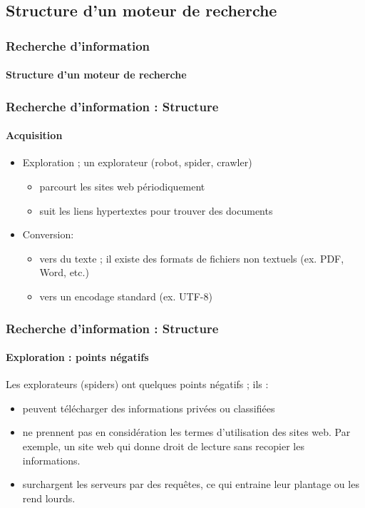 \documentclass[xcolor=table]{beamer}
\begin{document}
\subsection{Structure d'un moteur de recherche}

\begin{frame}
\frametitle{Recherche d'information}
\framesubtitle{Structure d'un moteur de recherche}

\begin{center}
\end{center}

\end{frame}

\begin{frame}
\frametitle{Recherche d'information : Structure}
\framesubtitle{Acquisition}

\begin{itemize}
	\item Exploration ; un explorateur (robot, spider, crawler)
	\begin{itemize}
		\item parcourt les sites web périodiquement 
		\item suit les liens hypertextes pour trouver des documents
	\end{itemize}

	\item Conversion:
	\begin{itemize}
		\item vers du texte ; il existe des formats de fichiers non textuels (ex. PDF, Word, etc.)
		\item vers un encodage standard (ex. UTF-8)
	\end{itemize}
\end{itemize}

\end{frame}

\begin{frame}
\frametitle{Recherche d'information : Structure}
\framesubtitle{Exploration : points négatifs}

Les explorateurs (spiders) ont quelques points négatifs ; ils :
\begin{itemize}
	\item peuvent télécharger des informations privées ou classifiées
	\item ne prennent pas en considération les termes d'utilisation des sites web. 
	Par exemple, un site web qui donne droit de lecture sans recopier les informations. 
	\item surchargent les serveurs par des requêtes, ce qui entraine leur plantage ou les rend lourds.
\end{itemize}

\end{frame}
\end{document}
